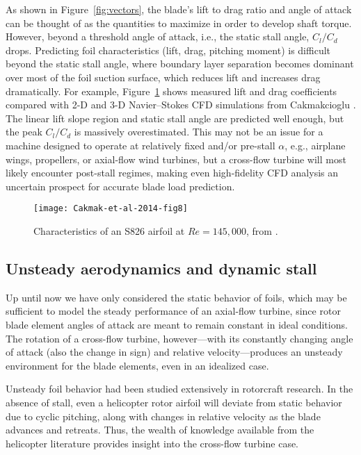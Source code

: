 As shown in Figure~\ref{fig:vectors}, the blade's lift to drag ratio and angle
of attack can be thought of as the quantities to maximize in order to develop
shaft torque. However, beyond a threshold angle of attack, i.e., the static
stall angle, $C_l/C_d$ drops. Predicting foil characteristics (lift, drag,
pitching moment) is difficult beyond the static stall angle, where boundary
layer separation becomes dominant over most of the foil suction surface, which
reduces lift and increases drag dramatically. For example,
Figure~\ref{fig:S826-perf} shows measured lift and drag coefficients compared
with 2-D and 3-D Navier--Stokes CFD simulations from Cakmakcioglu \etal
\cite{Cakmakcioglu2014}. The linear lift slope region and static stall angle are
predicted well enough, but the peak $C_l/C_d$ is massively overestimated. This
may not be an issue for a machine designed to operate at relatively fixed and/or
pre-stall $\alpha$, e.g., airplane wings, propellers, or axial-flow wind
turbines, but a cross-flow turbine will most likely encounter post-stall
regimes, making even high-fidelity CFD analysis an uncertain prospect for
accurate blade load prediction.

\begin{figure}[ht]
    \centering
    
    \texttt{[image: Cakmak-et-al-2014-fig8]}
    
    \caption{Characteristics of an S826 airfoil at $Re=145,000$, from
        \cite{Cakmakcioglu2014}.}
    
    \label{fig:S826-perf}
\end{figure}


\subsection{Unsteady aerodynamics and dynamic stall}

Up until now we have only considered the static behavior of foils, which may be
sufficient to model the steady performance of an axial-flow turbine, since rotor
blade element angles of attack are meant to remain constant in ideal conditions.
The rotation of a cross-flow turbine, however---with its constantly changing
angle of attack (also the change in sign) and relative velocity---produces an
unsteady environment for the blade elements, even in an idealized case.

Unsteady foil behavior had been studied extensively in rotorcraft research. In
the absence of stall, even a helicopter rotor airfoil will deviate from static
behavior due to cyclic pitching, along with changes in relative velocity as the
blade advances and retreats. Thus, the wealth of knowledge available from the
helicopter literature provides insight into the cross-flow turbine case.

